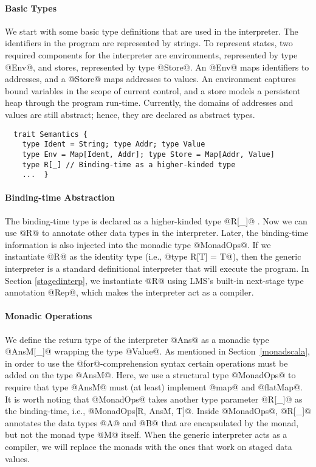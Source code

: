 \paragraph{Basic Types} We start with some basic type definitions that are used
in the interpreter. The identifiers in the program are represented by strings.
To represent states, two required components for the interpreter are
environments, represented by type @Env@, and stores, represented by type
@Store@. An @Env@ maps identifiers to addresses, and a @Store@ maps addresses to
values. An environment captures bound variables in the scope of current control, and
a store models a persistent heap through the program run-time.  Currently,
the domains of addresses and values are still abstract; hence, they are
declared as abstract types.
\begin{lstlisting}
  trait Semantics {
    type Ident = String; type Addr; type Value                 
    type Env = Map[Ident, Addr]; type Store = Map[Addr, Value] 
    type R[_] // Binding-time as a higher-kinded type
    ...  }
\end{lstlisting}

\paragraph{Binding-time Abstraction}
The binding-time type is declared as a higher-kinded type @R[_]@ \cite{Ofenbeck:2017:SGP:3136040.3136060}.
Now we can use @R@ to annotate other data types in the interpreter.
Later, the binding-time information is also injected into the monadic type
@MonadOps@.  If we instantiate @R@ as the identity type (i.e., @type R[T] = T@), 
then the generic interpreter is a standard definitional interpreter that
will execute the program.  In Section \ref{stagedinterp}, we instantiate @R@
using LMS's built-in next-stage type annotation @Rep@, which makes the
interpreter act as a compiler.

\paragraph{Monadic Operations} We define the return type of the interpreter
@Ans@ as a monadic type @AnsM[_]@ wrapping the type @Value@.
As mentioned in Section~\ref{monadscala}, in order to use the @for@-comprehension
syntax certain operations must be added on the type @AnsM@. Here, we use a
structural type @MonadOps@ to require that type @AnsM@ must (at least)
implement @map@ and @flatMap@. It is worth noting that @MonadOps@ takes another
type parameter @R[_]@ as the binding-time, i.e., @MonadOps[R, AnsM, T]@.
Inside @MonadOps@, @R[_]@ annotates the data types @A@ and @B@ that are
encapsulated by the monad, but not the monad type @M@ itself. When the generic
interpreter acts as a compiler, we will replace the monads with the ones that
work on staged data values.

